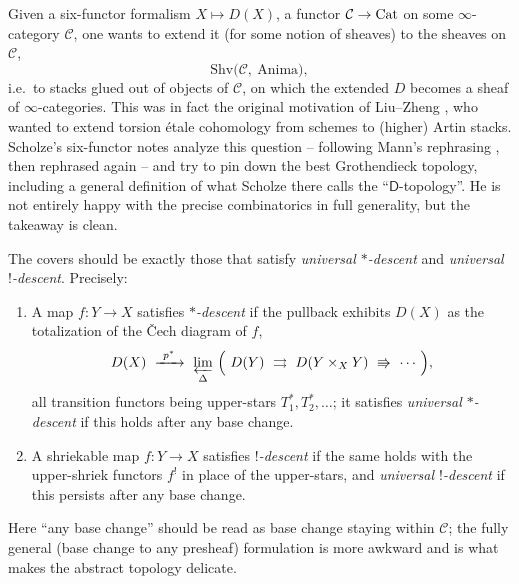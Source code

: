 \begin{remark}
\label{rmk:16:extension-question}
Given a six-functor formalism $X\mapsto D(X)$, a functor $\mathcal C\to\operatorname{Cat}$ on some
$\infty$-category $\mathcal C$, one wants to extend it (for some notion of sheaves) to
the sheaves on $\mathcal C$,
\begin{equation*}
\mathrm{Shv}\bigl(\mathcal C,\ \mathrm{Anima}\bigr),
\end{equation*}
i.e.\ to stacks glued out of objects of $\mathcal C$, on which the extended $D$ becomes a
sheaf of $\infty$-categories. This was in fact the original motivation of Liu--Zheng
\cite{liu2024enhancedoperationsbasechange}, who wanted to extend torsion \'etale
cohomology from schemes to (higher) Artin stacks. Scholze's six-functor notes
\cite{scholze2023six} analyze this question -- following Mann's rephrasing
\cite{mann2022padic6functorformalismrigidanalytic}, then rephrased again -- and try to
pin down the best Grothendieck topology, including a general definition of what Scholze
there calls the ``$\mathsf D$-topology''. He is not entirely happy with the precise
combinatorics in full generality, but the takeaway is clean.
\end{remark}

\begin{remark}
\label{rmk:16:takeaway}
The covers should be exactly those that satisfy \emph{universal $*$-descent} and
\emph{universal $!$-descent}. Precisely:
\begin{enumerate}
\item A map $f\colon Y\to X$ satisfies \emph{$*$-descent} if the pullback exhibits
$D(X)$ as the totalization of the \v Cech diagram of $f$,
\begin{equation*}
D(X)\ \xrightarrow{\ p^*\ }\ \varprojlim_{\Delta}\ \Bigl(\ D(Y)\ \rightrightarrows\ D(Y\times_X Y)\ \Rrightarrow\ \cdots\ \Bigr),
\end{equation*}
all transition functors being upper-stars $T_1^*,T_2^*,\dots$; it satisfies
\emph{universal $*$-descent} if this holds after any base change.
\item A shriekable map $f\colon Y\to X$ satisfies \emph{$!$-descent} if the same holds
with the upper-shriek functors $f^!$ in place of the upper-stars, and \emph{universal
$!$-descent} if this persists after any base change.
\end{enumerate}
Here ``any base change'' should be read as base change staying within $\mathcal C$; the
fully general (base change to any presheaf) formulation is more awkward and is what
makes the abstract topology delicate.
\end{remark}

